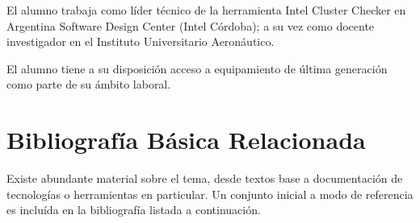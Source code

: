 \documentclass[a4paper]{article}
\begin{document}
El alumno trabaja como l\'ider t\'ecnico de la herramienta Intel Cluster
Checker en Argentina Software Design Center (Intel C\'ordoba); a su vez
como docente investigador en el Instituto Universitario Aeron\'autico.

El alumno tiene a su disposici\'on acceso a equipamiento de \'ultima
generaci\'on como parte de su \'ambito laboral.

\section{Bibliograf\'ia B\'asica Relacionada}

Existe abundante material sobre el tema, desde textos base a documentaci\'on
de tecnolog\'ias o herramientas en particular. Un conjunto inicial a modo de
referencia es inclu\'ida en la bibliograf\'ia listada a continuaci\'on.
\end{document}
